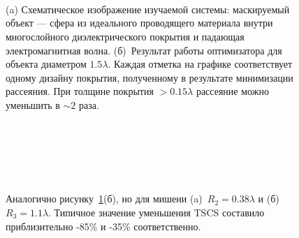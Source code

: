 \begin{figure}[p]
  \begin{minipage}[ht]{0.99\linewidth}
  \end{minipage}\\
  \vfill
  \begin{minipage}[ht]{0.99\linewidth}
  \end{minipage}\\
  \vfill
  \begin{minipage}[ht]{0.99\linewidth}
  \end{minipage}\\
  \vfill
  \begin{minipage}[ht]{0.99\linewidth}
  \end{minipage}
  \vfill

  \caption{(a) Схематическое изображение изучаемой системы:
    маскируемый объект --- сфера из идеального проводящего материала
    внутри многослойного диэлектрического покрытия и падающая
    электромагнитная волна. (б)~Результат работы оптимизатора для
    объекта диаметром $1.5\lambda$.  Каждая отметка на графике
    соответствует одному дизайну покрытия, полученному в результате
    минимизации рассеяния. При толщине покрытия $>0.15\lambda$
    рассеяние можно уменьшить в $\sim 2$ раза.}
  \label{img:scattering}  
\end{figure}

\begin{figure}[p]
  \begin{minipage}[ht]{0.99\linewidth}
  \end{minipage}\\
  \begin{minipage}[ht]{0.99\linewidth}
  \end{minipage}\\
  \vfill
  \begin{minipage}[ht]{0.99\linewidth}
  \end{minipage}\\
  \begin{minipage}[ht]{0.99\linewidth}
  \end{minipage}
  \vfill
  \caption{Аналогично рисунку~\ref{img:scattering}(б), но для мишени
    (a)~${R_2 = 0.38\lambda}$ и (б)~${R_3 = 1.1\lambda}$.  Типичное
    значение уменьшения TSCS составило приблизительно -85\% и -35\%
    соответственно.  \label{img:rcs-overview-r14-42}}%
\end{figure}


